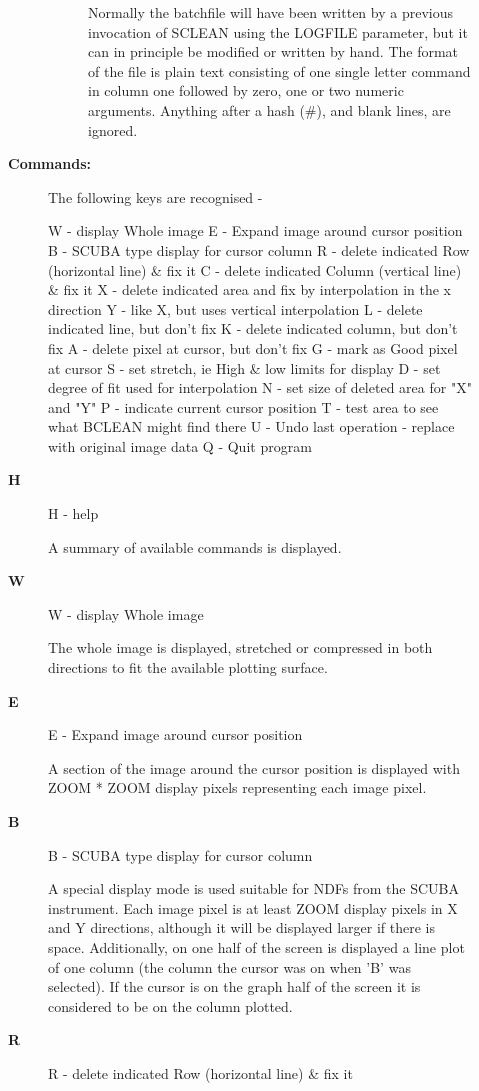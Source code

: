 \begin{description}
\begin{description}
\begin{description}
 Normally the batchfile will have been written by a previous invocation
 of SCLEAN using the LOGFILE parameter, but it can in principle be
 modified or written by hand.  The format of the file is plain text
 consisting of one single letter command in column one followed by
 zero, one or two numeric arguments.  Anything after a hash (\#), and
 blank lines, are ignored.
\end{description}

\item [\textbf{Commands:}]
 The following keys are recognised -

 W - display Whole image
 E - Expand image around cursor position
 B - SCUBA type display for cursor column
 R - delete indicated Row (horizontal line) \& fix it
 C - delete indicated Column (vertical line) \& fix it
 X - delete indicated area and fix by interpolation in the x direction
 Y - like X, but uses vertical interpolation
 L - delete indicated line, but don't fix
 K - delete indicated column, but don't fix
 A - delete pixel at cursor, but don't fix
 G - mark as Good pixel at cursor
 S - set stretch, ie High \& low limits for display
 D - set degree of fit used for interpolation
 N - set size of deleted area for "X" and "Y"
 P - indicate current cursor position
 T - test area to see what BCLEAN might find there
 U - Undo last operation - replace with original image data
 Q - Quit program
\item [\textbf{H}]
 H - help

    A summary of available commands is displayed.
\item [\textbf{W}]
 W - display Whole image

    The whole image is displayed, stretched or compressed in both
    directions to fit the available plotting surface.
\item [\textbf{E}]
 E - Expand image around cursor position

    A section of the image around the cursor position is displayed
    with ZOOM * ZOOM display pixels representing each image pixel.
\item [\textbf{B}]
 B - SCUBA type display for cursor column

    A special display mode is used suitable for NDFs from the SCUBA
    instrument.  Each image pixel is at least ZOOM display pixels in
    X and Y directions, although it will be displayed larger if
    there is space.  Additionally, on one half of the screen is
    displayed a line plot of one column (the column the cursor was
    on when 'B' was selected).  If the cursor is on the graph half
    of the screen it is considered to be on the column plotted.
\item [\textbf{R}]
 R - delete indicated Row (horizontal line) \& fix it


\end{description}
\end{description}
